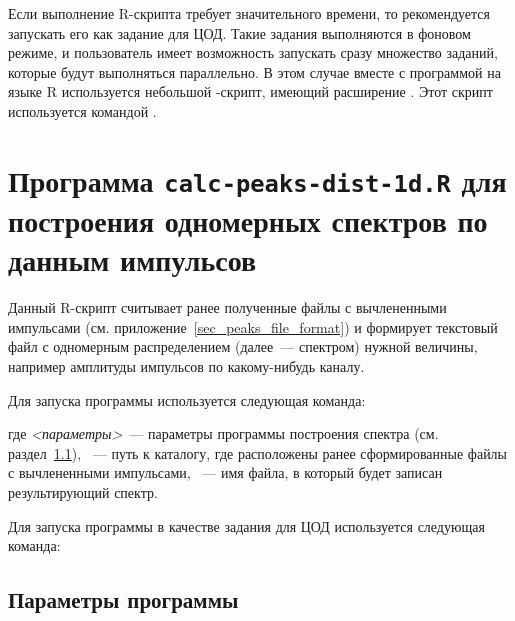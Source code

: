 Если выполнение R-скрипта требует значительного времени, то рекомендуется запускать его как задание для ЦОД. Такие задания выполняются в фоновом режиме, и пользователь имеет возможность запускать сразу множество заданий, которые будут выполняться параллельно. В этом случае вместе с программой на языке R используется небольшой -скрипт, имеющий расширение . Этот скрипт используется командой  \cite{SlurmSbatch}.

\section{Программа {\tt calc-peaks-dist-1d.R} для построения одномерных спектров по данным импульсов}

Данный R-скрипт считывает ранее полученные файлы с вычлененными импульсами (см. приложение~\ref{sec_peaks_file_format}) и формирует текстовый файл с одномерным распределением (далее~--- спектром) нужной величины, например амплитуды импульсов по какому-нибудь каналу.

Для запуска программы используется следующая команда:

\bigskip

\noindent {}

\bigskip
\noindent где {\it <параметры>}~--- параметры программы построения спектра (см. раздел~\ref{sec-peaks-distr-1d-params}), {\it <каталог с файлами импульсов>}~--- путь к каталогу, где расположены ранее сформированные файлы с вычлененными импульсами, {\it <имя результирующего файла>}~--- имя файла, в который будет записан результирующий спектр.

Для запуска программы в качестве задания для ЦОД используется следующая команда:

\bigskip

\noindent {}

\subsection{Параметры программы}
\label{sec-peaks-distr-1d-params}

